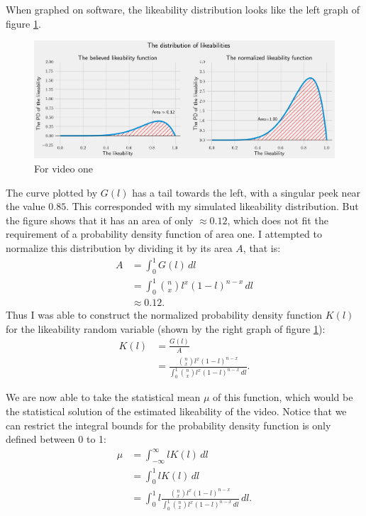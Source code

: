 \documentclass[a4paper,11pt]{article}
\begin{document}
When graphed on software, the likeability distribution looks like the left graph of figure \ref{fig:beta}.

\begin{figure}[H]
    \centering
    \includegraphics[width=1\textwidth]{assets/beta_pdfs.png}
    \caption{For video one}
    \label{fig:beta}
\end{figure}

The curve plotted by $G(l)$ has a tail towards the left, with a singular peek near the value $0.85$. This corresponded with my simulated likeability distribution. But the figure shows that it has an area of only $\approx 0.12$, which does not fit the requirement of a probability density function of area one. I attempted to normalize this distribution by dividing it by its area $A$, that is:
\begin{align*}
    A &= \int_{0}^{1} G(l) \, dl\\
    &= \int_{0}^{1} {n \choose x} l^x (1-l)^{n-x} \, dl\\
    &\approx 0.12.
\end{align*}
Thus I was able to construct the normalized probability density function $K(l)$ for the likeability random variable (shown by the right graph of figure \ref{fig:beta}):
\begin{align*}
    K(l) &= \frac{G(l)}{A}\\
    &= \frac{ {n \choose x} l^x (1-l)^{n-x}} {\int_{0}^{1} {n \choose x} l^x (1-l)^{n-x} \, dl}.
\end{align*}

We are now able to take the statistical mean $\mu$ of this function, which would be the statistical solution of the estimated likeability of the video. Notice that we can restrict the integral bounds for the probability density function is only defined between 0 to 1:
\begin{align*}
    \mu &= \int_{-\infty}^{\infty} l K(l) \, dl\\
    &=\int_{0}^{1} l K(l) \, dl\\
    &=\int_{0}^{1} l \frac{ {n \choose x} l^x (1-l)^{n-x}} {\int_{0}^{1} {n \choose x} l^x (1-l)^{n-x} \, dl} \, dl.
\end{align*}
\end{document}
